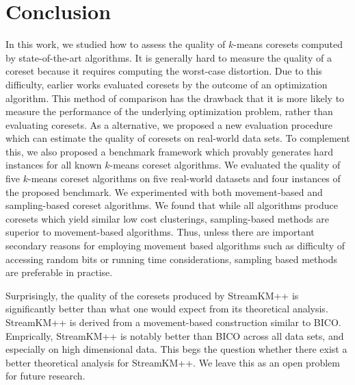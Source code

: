 \section{Conclusion} \label{sec:conclusion}
In this work, we studied how to assess the quality of $k$-means coresets computed by state-of-the-art algorithms. It is generally hard to measure the quality of a coreset because it requires computing the worst-case distortion. Due to this difficulty, earlier works evaluated coresets by the outcome of an optimization algorithm. This method of comparison has the drawback that it is more likely to measure the performance of the underlying optimization problem, rather than evaluating coresets. As a alternative, we proposed a new evaluation procedure which can estimate the quality of coresets on real-world data sets. To complement this, we also proposed a benchmark framework which provably generates hard instances for all known $k$-means coreset algorithms. We evaluated the quality of five $k$-means coreset algorithms on five real-world datasets and four instances of the proposed benchmark. We experimented with both movement-based and sampling-based coreset algorithms. We found that while all algorithms produce coresets which yield similar low cost clusterings, sampling-based methods are superior to movement-based algorithms. Thus, unless there are important secondary reasons for employing movement based algorithms such as difficulty of accessing random bits or running time considerations, sampling based methods are preferable in practise.


Surprisingly, the quality of the coresets produced by StreamKM++ is significantly better than what one would expect from its theoretical analysis. StreamKM++ is derived from a movement-based construction similar to BICO. Emprically, StreamKM++ is notably better than BICO across all data sets, and especially on high dimensional data. This begs the question whether there exist a better theoretical analysis for StreamKM++. We leave this as an open problem for future research.
